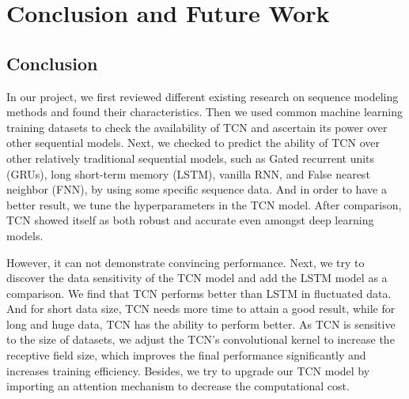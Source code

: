 
\chapter{Conclusion and Future Work} %

\label{Chapter5} %


\section{Conclusion}
In our project, we first reviewed different existing research on sequence modeling methods and found their characteristics. Then we used common machine learning training datasets to check the availability of TCN and ascertain its power over other sequential models. Next, we checked to predict the ability of TCN over other relatively traditional sequential models, such as Gated recurrent units (GRUs), long short-term memory (LSTM), vanilla RNN, and False nearest neighbor (FNN),  by using some specific sequence data. And in order to have a better result, we tune the hyperparameters in the TCN model. After comparison, TCN showed itself as both robust and accurate even amongst deep learning models. 

However, it can not demonstrate convincing performance. Next, we try to discover the data sensitivity of the TCN model and add the LSTM model as a comparison. We find that TCN performs better than LSTM in fluctuated data. And for short data size, TCN needs more time to attain a good result, while for long and huge data, TCN has the ability to perform better. As TCN is sensitive to the size of datasets, we adjust the TCN's convolutional kernel to increase the receptive field size, which improves the final performance significantly and increases training efficiency. Besides, we try to upgrade our TCN model by importing an attention mechanism to decrease the computational cost.

